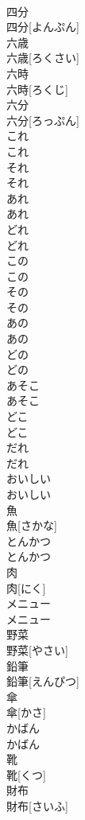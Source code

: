 \documentclass[8pt]{extreport}
\begin{document}
\begin{CJK}{UTF8}{min}
\\	四分	
\\	四分[よんぷん]
\\	六歳	
\\	六歳[ろくさい]
\\	六時	
\\	六時[ろくじ]
\\	六分	
\\	六分[ろっぷん]
\\	これ	
\\	これ
\\	それ	
\\	それ
\\	あれ	
\\	あれ
\\	どれ	
\\	どれ
\\	この	
\\	この
\\	その	
\\	その
\\	あの	
\\	あの
\\	どの	
\\	どの
\\	あそこ	
\\	あそこ
\\	どこ	
\\	どこ
\\	だれ	
\\	だれ
\\	おいしい	
\\	おいしい
\\	魚	
\\	魚[さかな]
\\	とんかつ	
\\	とんかつ
\\	肉	
\\	肉[にく]
\\	メニュー	
\\	メニュー
\\	野菜	
\\	野菜[やさい]
\\	鉛筆	
\\	鉛筆[えんぴつ]
\\	傘	
\\	傘[かさ]
\\	かばん	
\\	かばん
\\	靴	
\\	靴[くつ]
\\	財布	
\\	財布[さいふ]

\end{CJK}
\end{document}
